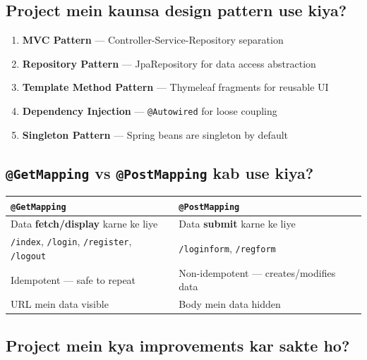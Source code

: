 \documentclass[12pt,a4paper]{article}
\begin{document}
\subsection{Project mein kaunsa design pattern use kiya?}

\begin{answerbox}
\begin{enumerate}
    \item \textbf{MVC Pattern} --- Controller-Service-Repository separation
    \item \textbf{Repository Pattern} --- JpaRepository for data access abstraction
    \item \textbf{Template Method Pattern} --- Thymeleaf fragments for reusable UI
    \item \textbf{Dependency Injection} --- \texttt{@Autowired} for loose coupling
    \item \textbf{Singleton Pattern} --- Spring beans are singleton by default
\end{enumerate}
\end{answerbox}

\subsection{\texttt{@GetMapping} vs \texttt{@PostMapping} kab use kiya?}

\begin{answerbox}
\begin{center}
\begin{tabular}{p{6cm} p{6cm}}
\toprule
\textbf{\texttt{@GetMapping}} & \textbf{\texttt{@PostMapping}} \\
\midrule
Data \textbf{fetch/display} karne ke liye & Data \textbf{submit} karne ke liye \\
\texttt{/index}, \texttt{/login}, \texttt{/register}, \texttt{/logout} & \texttt{/loginform}, \texttt{/regform} \\
Idempotent --- safe to repeat & Non-idempotent --- creates/modifies data \\
URL mein data visible & Body mein data hidden \\
\bottomrule
\end{tabular}
\end{center}
\end{answerbox}

\subsection{Project mein kya improvements kar sakte ho?}
\end{document}
